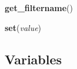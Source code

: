     \vspace{0.5ex}

    \begin{boxedminipage}{\textwidth}

    \raggedright \textbf{get\_filtername}()

    \end{boxedminipage}

    \label{filterwh:set}

    \vspace{0.5ex}

    \begin{boxedminipage}{\textwidth}

    \raggedright \textbf{set}(\textit{value})

    \end{boxedminipage}



  \subsection{Variables}


